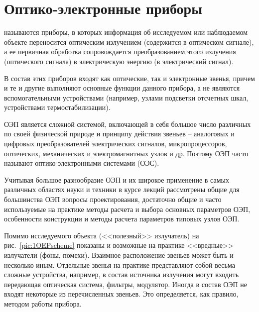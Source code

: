 \documentclass{tufte-book}
\begin{document}
\mainmatter


\chapter{Оптико-электронные приборы}
\label{ch:tufte-design}

 называются приборы, в которых информация об исследуемом или наблюдаемом объекте переносится оптическим излучением (содержится в оптическом сигнале), а ее первичная обработка сопровождается преобразованием этого излучения (оптического сигнала) в электрическую энергию (в электрический сигнал). 


В состав этих приборов входят как оптические, так и электронные звенья, причем и те и другие выполняют основные функции данного прибора, а не являются вспомогательными устройствами (например, узлами подсветки отсчетных шкал, устройствами термостабилизации).

ОЭП является сложной системой, включающей в себя большое число различных по своей физической природе и принципу действия звеньев -- аналоговых и цифровых преобразователей электрических сигналов, микропроцессоров, оптических, механических и электромагнитных узлов и др. Поэтому ОЭП часто называют оптико-электронными системами (ОЭС). 

Учитывая большое разнообразие ОЭП и их широкое применение в самых различных областях науки и техники  в курсе лекций рассмотрены общие для большинства ОЭП вопросы проектирования, достаточно общие и часто используемые на практике методы расчета и выбора основных параметров ОЭП, особенности конструкции и методы расчета параметров типовых узлов ОЭП.

Помимо исследуемого объекта (<<полезный>> излучатель) на рис.~\ref{pic:1OEPscheme} показаны и возможные на практике <<вредные>> излучатели (фоны, помехи). Взаимное расположение звеньев может быть и несколько иным. Отдельные звенья на практике представляют собой весьма сложные устройства, например, в состав источника излучения могут входить передающая оптическая система, фильтры, модулятор. Иногда в состав ОЭП не входят некоторые из перечисленных звеньев. Это определяется, как правило, методом работы прибора.
\end{document}

